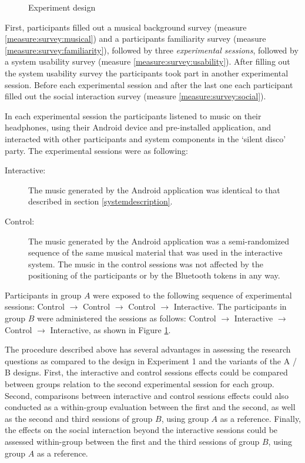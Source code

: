 \documentclass[a4paper,11pt]{article}
\newcommand{\definition}[1]{\emph{#1}}
\begin{document}
{\begin{figure}[!htb]
	\centering
	\def\svgwidth{0.9\textwidth}
  	
	\caption{Experiment design}\label{fig:experiment}
\end{figure}

First, participants filled out a musical background survey (measure \ref{measure:survey:musical}) and a participants familiarity survey (measure \ref{measure:survey:familiarity}), followed by three \definition{experimental sessions}, followed by a system usability survey (measure \ref{measure:survey:usability}).
After filling out the system usability survey the participants took part in another experimental session.
Before each experimental session and after the last one each participant filled out the social interaction survey (measure \ref{measure:survey:social}).

In each experimental session the participants listened to music on their headphones, using their Android device and pre-installed application, and interacted with other participants and system components in the `silent disco' party.
The experimental sessions were as following:

\begin{description}
	\item[Interactive:] The music generated by the Android application was identical to that described in section \ref{systemdescription}.
	\item[Control:] The music generated by the Android application was a semi-randomized sequence of the same musical material that was used in the interactive system.
  The music in the control sessions was not affected by the positioning of the participants or by the Bluetooth tokens in any way.
\end{description}

Participants in group $A$ were exposed to the following sequence of experimental sessions: Control $\rightarrow$ Control $\rightarrow$ Control $\rightarrow$ Interactive.
The participants in group $B$ were administered the sessions as follows: Control $\rightarrow$ Interactive $\rightarrow$ Control $\rightarrow$ Interactive, as shown in Figure \ref{fig:experiment}.

The procedure described above has several advantages in assessing the research questions as compared to the design in Experiment 1 and the variants of the A / B designs.
First, the interactive and control sessions effects could be compared between groups relation to the second experimental session for each group.
Second, comparisons between interactive and control sessions effects could also conducted as a within-group evaluation between the first and the second, as well as the second and third sessions of group $B$, using group $A$ as a reference.
Finally, the effects on the social interaction beyond the interactive sessions could be assessed within-group between the first and the third sessions of group $B$, using group $A$ as a reference.

}
\end{document}
